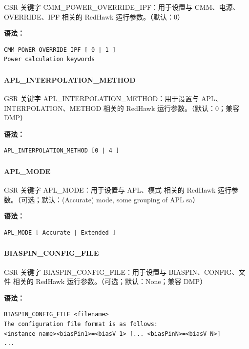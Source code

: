 GSR 关键字 CMM_POWER_OVERRIDE_IPF：用于设置与 CMM、电源、OVERRIDE、IPF 相关的 RedHawk 运行参数。（默认：0）

\textbf{语法：}
\begin{lstlisting}
CMM_POWER_OVERRIDE_IPF [ 0 | 1 ]
Power calculation keywords
\end{lstlisting}

\subsubsection{}
\paragraph*{APL_INTERPOLATION_METHOD}

GSR 关键字 APL_INTERPOLATION_METHOD：用于设置与 APL、INTERPOLATION、METHOD 相关的 RedHawk 运行参数。（默认：0；兼容 DMP）

\textbf{语法：}
\begin{lstlisting}
APL_INTERPOLATION_METHOD [0 | 4 ]
\end{lstlisting}

\subsubsection{}
\paragraph*{APL_MODE}

GSR 关键字 APL_MODE：用于设置与 APL、模式 相关的 RedHawk 运行参数。（可选；默认：(Accurate) mode, some grouping of APL sa）

\textbf{语法：}
\begin{lstlisting}
APL_MODE [ Accurate | Extended ]
\end{lstlisting}

\subsubsection{}
\paragraph*{BIASPIN_CONFIG_FILE}

GSR 关键字 BIASPIN_CONFIG_FILE：用于设置与 BIASPIN、CONFIG、文件 相关的 RedHawk 运行参数。（可选；默认：None；兼容 DMP）

\textbf{语法：}
\begin{lstlisting}
BIASPIN_CONFIG_FILE <filename>
The configuration file format is as follows:
<instance_name><biasPin1>=<biasV_1> [... <biasPinN>=<biasV_N>]
...
\end{lstlisting}

